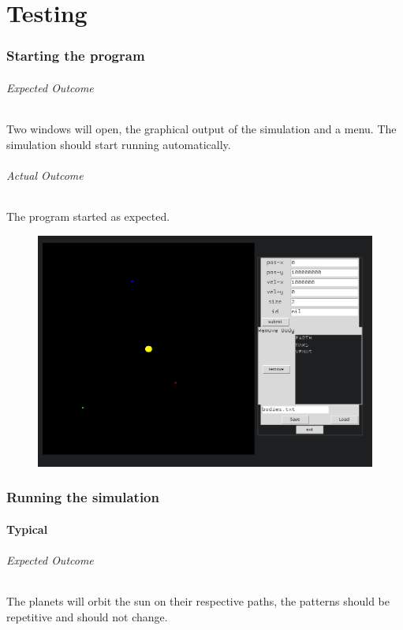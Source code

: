 \part{Testing}
\section{Starting the program}
\paragraph{Expected Outcome} 
Two windows will open, the graphical output of the simulation and a menu. The
simulation should start running automatically. 
\paragraph{Actual Outcome} 
The program started as expected.
\begin{figure}[H]
	\includegraphics[width=\textwidth]{./img/start.png}
\end{figure}

\section{Running the simulation}
\subsection{Typical}
\paragraph{Expected Outcome}
The planets will orbit the sun on their respective paths, the patterns should be
repetitive and should not change.
